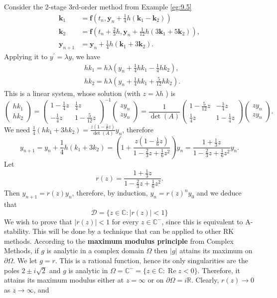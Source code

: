\documentclass[a4paper]{article}
\begin{document}
\begin{example}
    Consider the 2-stage 3rd-order method from Example \ref{eg:9.5}
\[
\begin{aligned}
\mathbf{k}_1 & =\mathbf{f}\left(t_n, \mathbf{y}_n+\frac{1}{4} h\left(\mathbf{k}_1-\mathbf{k}_2\right)\right) \\
\mathbf{k}_2 & =\mathbf{f}\left(t_n+\frac{2}{3} h, \mathbf{y}_n+\frac{1}{12} h\left(3 \mathbf{k}_1+5 \mathbf{k}_2\right)\right), \\
\mathbf{y}_{n+1} & =\mathbf{y}_n+\frac{1}{4} h\left(\mathbf{k}_1+3 \mathbf{k}_2\right) .
\end{aligned}
\]
Applying it to $y^{\prime}=\lambda y$, we have
\[
\begin{aligned}
& h k_1=h \lambda\left(y_n+\frac{1}{4} h k_1-\frac{1}{4} h k_2\right), \\
& h k_2=h \lambda\left(y_n+\frac{1}{4} h k_1+\frac{5}{12} h k_2\right) .
\end{aligned}
\]
This is a linear system, whose solution (with $z=\lambda h$ ) is
\[
\begin{pmatrix}
    h k_1 \\
h k_2
\end{pmatrix}=
\begin{pmatrix}
    1-\frac{1}{4} z & \frac{1}{4} z \\
-\frac{1}{4} z & 1-\frac{5}{12} z
\end{pmatrix}^{-1}
\begin{pmatrix}
    z y_n \\
z y_n
\end{pmatrix}=\frac{1}{\det(A)}
\begin{pmatrix}
    1-\frac{5}{12} z & -\frac{1}{4} z \\
\frac{1}{4} z & 1-\frac{1}{4} z
\end{pmatrix}
\begin{pmatrix}
    z y_n \\
z y_n
\end{pmatrix}.
\]
We need $\frac{1}{4}\left(h k_1+3 h k_2\right)=\frac{z\left(1-\frac{1}{6} z\right)}{\det(A)} y_n$, therefore
\[
y_{n+1}=y_n+\frac{1}{4} h\left(k_1+3 k_2\right)=\left(1+\frac{z\left(1-\frac{1}{6} z\right)}{1-\frac{2}{3} z+\frac{1}{6} z^2}\right) y_n=\frac{1+\frac{1}{3} z}{1-\frac{2}{3} z+\frac{1}{6} z^2} y_n .
\]
Let
\[
r(z)=\frac{1+\frac{1}{3} z}{1-\frac{2}{3} z+\frac{1}{6} z^2} .
\]
Then $y_{n+1}=r(z) y_n$, therefore, by induction, $y_n=r(z)^n y_0$ and we deduce that
\[
\mathcal{D}=\{z \in \mathbb{C}:|r(z)|<1\}
\]
We wish to prove that $|r(z)|<1$ for every $z \in \mathbb{C}^{-}$, since this is equivalent to A-stability. This will be done by a technique that can be applied to other RK methods. According to the \textbf{maximum modulus principle} from Complex Methods, if $g$ is analytic in a complex domain $\Omega$ then $|g|$ attains its maximum on $\partial \Omega$. We let $g=r$. This is a rational function, hence its only singularities are the poles $2 \pm i \sqrt{2}$ and $g$ is analytic in $\Omega=\mathbb{C}^{-}=\{z \in \mathbb{C}: \operatorname{Re} z<0\}$. Therefore, it attains its maximum modulus either at $z=\infty$ or on $\partial \Omega=i \mathbb{R}$. Clearly, $r(z) \rightarrow 0$ as $z \rightarrow \infty$, and

\end{example}
\end{document}
